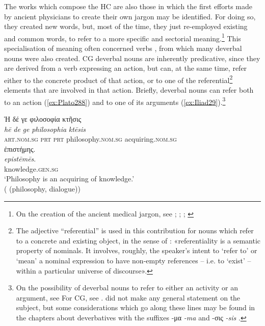 \documentclass[output=paper,colorlinks,citecolor=brown]{langscibook}
\begin{document}
The works which compose the HC are also those in which the first efforts made by ancient physicians to create their own jargon may be identified. For doing so, they created new words, but, most of the time, they just re-employed existing and common words, to refer to a more specific and sectorial meaning.\footnote{On the creation of the ancient medical jargon, see \citet{Benveniste1965}; \citet{Irigoin1980,Irigoin1983}; \citet{Skoda2004}; \citet{Schironi2013NEW}} This specialisation of meaning often concerned verbs \citep{Squeri2023}, from which many deverbal nouns were also created. CG deverbal nouns are inherently predicative, since they are derived from a verb expressing an action, but can, at the same time, refer either to the concrete product of that action, or to one of the referential\footnote{The adjective “referential” is used in this contribution for nouns which refer to a concrete and existing object, in the sense of \citet[293]{Givón1978}: «referentiality is a semantic property of nominals. It involves, roughly, the speaker’s intent to ‘refer to’ or ‘mean’ a nominal expression to have non-empty references – i.e. to ‘exist’ – within a particular universe of discourse». } elements that are involved in that action. Briefly, deverbal nouns can refer both  to an action (\ref{ex:Plato288}) and to one of its arguments (\ref{ex:Iliad29}).\footnote{On the possibility of deverbal nouns to refer to either an activity or an argument, see \citet{comriethompson2006} For CG, see \citet[31--34]{Civilleri2012}. \citet{Chantraine1933} did not make any general statement on the subject, but some considerations which go along these lines may be found in the chapters about deverbatives with the suffixes -μα \textit{-ma} \citep[183]{Chantraine1933} and -σις \textit{-sis} \citep[287--288]{Chantraine1933}.}

\begin{exe}
\ex\label{ex:Plato288}
\glll Ἡ δέ γε φιλοσοφία κτῆσις  \\ 
\textit{hē} \textit{de} \textit{ge}  \textit{philosophia}  \textit{ktēsis}  \\
\textsc{art.nom.sg} \textsc{prt} \textsc{prt} philosophy.\textsc{nom.sg} acquiring.\textsc{nom.sg}  \\

\glll ἐπιστήμης. \\
\textit{epistēmēs}. \\
knowledge.\textsc{gen.sg} \\
\glt ‘Philosophy is an acquiring of knowledge.' \\
\hspace*{\fill}( (philosophy, dialogue))
\end{exe}
\end{document}
